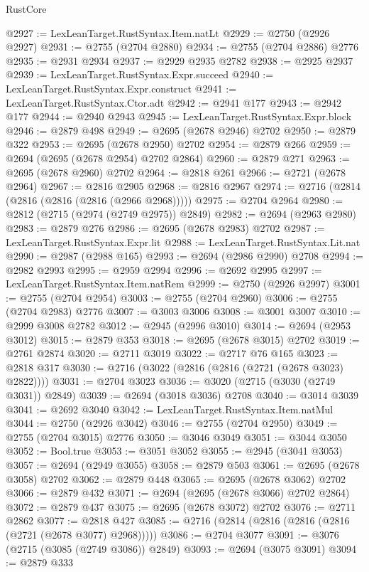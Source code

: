 \begin{lexlean}{RustCore}
\begin{coremodule}
@2927 := LexLeanTarget.RustSyntax.Item.natLt
@2929 := @2750 (@2926 @2927)
@2931 := @2755 (@2704 @2880)
@2934 := @2755 (@2704 @2886) @2776
@2935 := @2931 @2934
@2937 := @2929 @2935 @2782
@2938 := @2925 @2937
@2939 := LexLeanTarget.RustSyntax.Expr.succeed
@2940 := LexLeanTarget.RustSyntax.Expr.construct
@2941 := LexLeanTarget.RustSyntax.Ctor.adt
@2942 := @2941 @177
@2943 := @2942 @177
@2944 := @2940 @2943
@2945 := LexLeanTarget.RustSyntax.Expr.block
@2946 := @2879 @498
@2949 := @2695 (@2678 @2946) @2702
@2950 := @2879 @322
@2953 := @2695 (@2678 @2950) @2702
@2954 := @2879 @266
@2959 := @2694 (@2695 (@2678 @2954) @2702 @2864)
@2960 := @2879 @271
@2963 := @2695 (@2678 @2960) @2702
@2964 := @2818 @261
@2966 := @2721 (@2678 @2964)
@2967 := @2816 @2905
@2968 := @2816 @2967
@2974 := @2716 (@2814 (@2816 (@2816 (@2816 (@2966 @2968)))))
@2975 := @2704 @2964
@2980 := @2812 (@2715 (@2974 (@2749 @2975)) @2849)
@2982 := @2694 (@2963 @2980)
@2983 := @2879 @276
@2986 := @2695 (@2678 @2983) @2702
@2987 := LexLeanTarget.RustSyntax.Expr.lit
@2988 := LexLeanTarget.RustSyntax.Lit.nat
@2990 := @2987 (@2988 @165)
@2993 := @2694 (@2986 @2990) @2708
@2994 := @2982 @2993
@2995 := @2959 @2994
@2996 := @2692 @2995
@2997 := LexLeanTarget.RustSyntax.Item.natRem
@2999 := @2750 (@2926 @2997)
@3001 := @2755 (@2704 @2954)
@3003 := @2755 (@2704 @2960)
@3006 := @2755 (@2704 @2983) @2776
@3007 := @3003 @3006
@3008 := @3001 @3007
@3010 := @2999 @3008 @2782
@3012 := @2945 (@2996 @3010)
@3014 := @2694 (@2953 @3012)
@3015 := @2879 @353
@3018 := @2695 (@2678 @3015) @2702
@3019 := @2761 @2874
@3020 := @2711 @3019
@3022 := @2717 @76 @165
@3023 := @2818 @317
@3030 := @2716 (@3022 (@2816 (@2816 (@2721 (@2678 @3023) @2822))))
@3031 := @2704 @3023
@3036 := @3020 (@2715 (@3030 (@2749 @3031)) @2849)
@3039 := @2694 (@3018 @3036) @2708
@3040 := @3014 @3039
@3041 := @2692 @3040
@3042 := LexLeanTarget.RustSyntax.Item.natMul
@3044 := @2750 (@2926 @3042)
@3046 := @2755 (@2704 @2950)
@3049 := @2755 (@2704 @3015) @2776
@3050 := @3046 @3049
@3051 := @3044 @3050
@3052 := Bool.true
@3053 := @3051 @3052
@3055 := @2945 (@3041 @3053)
@3057 := @2694 (@2949 @3055)
@3058 := @2879 @503
@3061 := @2695 (@2678 @3058) @2702
@3062 := @2879 @448
@3065 := @2695 (@2678 @3062) @2702
@3066 := @2879 @432
@3071 := @2694 (@2695 (@2678 @3066) @2702 @2864)
@3072 := @2879 @437
@3075 := @2695 (@2678 @3072) @2702
@3076 := @2711 @2862
@3077 := @2818 @427
@3085 := @2716 (@2814 (@2816 (@2816 (@2816 (@2721 (@2678 @3077) @2968)))))
@3086 := @2704 @3077
@3091 := @3076 (@2715 (@3085 (@2749 @3086)) @2849)
@3093 := @2694 (@3075 @3091)
@3094 := @2879 @333

\end{coremodule}
\end{lexlean}
